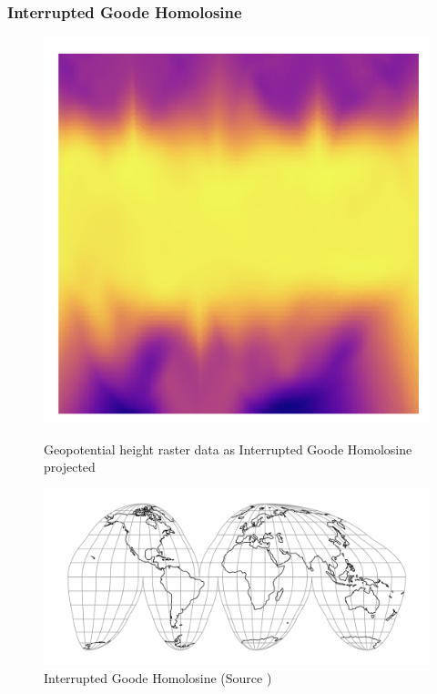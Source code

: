 \subsubsection*{Interrupted Goode Homolosine}
\begin{figure}[h]
    \centering
    \begin{minipage}{0.30\textwidth}
        \centering
        \includegraphics[width=0.9\linewidth]{figures/chapter-8/geopoth_goode.png}
        \caption{ Geopotential height raster data as Interrupted Goode Homolosine projected}
        \label{fig:ig_geopoth_raster}
    \end{minipage}\hfill
    \begin{minipage}{0.30\textwidth}
        \centering
        \includegraphics[width=0.9\linewidth]{figures/chapter-8/igh.png}
        \caption{Interrupted Goode Homolosine (Source \cite{PROJ_SITE})}
        \label{fig:ig_proj}
    \end{minipage}\hfill

\end{figure}
